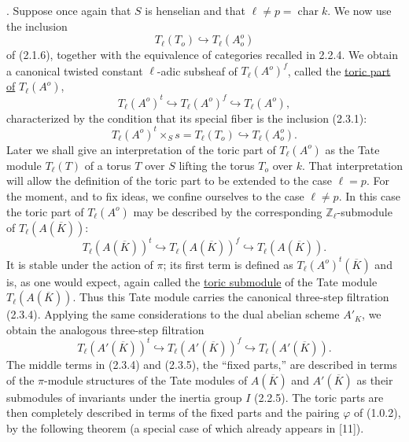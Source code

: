 
\medskip
{}. Suppose once again that $S$ is henselian and that
$\ell\ne p=\operatorname{char}k$.  We now use the inclusion
\begin{equation}\tag{2.3.1}
 T_\ell(T_o)\hookrightarrow T_\ell(A_o^o)
\end{equation}
of (2.1.6), together with the equivalence of categories recalled in
2.2.4.  We obtain a canonical twisted constant $\ell$-adic subsheaf
of $T_\ell(A^o)^f$, called the \underline{toric part of}
$T_\ell(A^o)$,
\begin{equation}\tag{2.3.2}
 T_\ell(A^o)^t\hookrightarrow T_\ell(A^o)^f
 \hookrightarrow T_\ell(A^o),
\end{equation}
characterized by the condition that its special fiber is the inclusion
(2.3.1):
\begin{equation}\tag{2.3.3}
 T_\ell(A^o)^t\times_Ss=T_\ell(T_o)
 \hookrightarrow T_\ell(A_o^o).
\end{equation}
Later we shall give an interpretation of the toric part of
$T_\ell(A^o)$ as the Tate module $T_\ell(T)$ of a torus $T$ over $S$
lifting the torus $T_o$ over $k$.  That interpretation will allow the
definition of the toric part to be extended to the case $\ell=p$.
For the moment, and to fix ideas, we confine ourselves to the case
$\ell\ne p$.  In this case the toric part of $T_\ell(A^o)$ may be
described by the corresponding $\mathbb Z_\ell$-submodule of
$T_\ell(A(\overline K))$:
\begin{equation}\tag{2.3.4}
 T_\ell(A(\overline K))^t\hookrightarrow
 T_\ell(A(\overline K))^f\hookrightarrow
 T_\ell(A(\overline K)).
\end{equation}
It is stable under the action of $\pi$; its first term is defined as
$T_\ell(A^o)^t(\overline K)$ and is, as one would expect, again called
the \underline{toric submodule} of the Tate module
$T_\ell(A(\overline K))$.  Thus this Tate module carries the canonical
three-step filtration (2.3.4).  Applying the same considerations to
the dual abelian scheme $A'_K$, we obtain the analogous three-step
filtration
\begin{equation}\tag{2.3.5}
 T_\ell(A'(\overline K))^t\hookrightarrow
 T_\ell(A'(\overline K))^f\hookrightarrow
 T_\ell(A'(\overline K)).
\end{equation}
The middle terms in (2.3.4) and (2.3.5), the ``fixed parts,'' are
described in terms of the $\pi$-module structures of the Tate modules
of $A(\overline K)$ and $A'(\overline K)$ as their submodules of
invariants under the inertia group $I$ (2.2.5).  The toric parts are
then completely described in terms of the fixed parts and the pairing
$\varphi$ of (1.0.2), by the following theorem (a special case of which
already appears in [11]).

